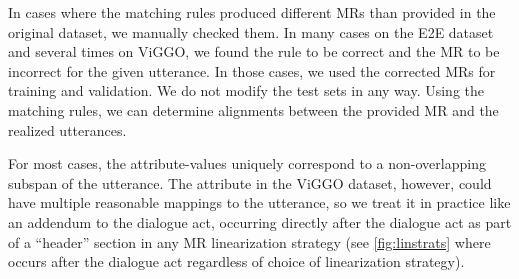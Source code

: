 In cases where the matching rules produced different MRs than provided in the
original dataset, we manually checked them. In many cases on the E2E dataset
and several times on ViGGO, we found the rule to be correct and the MR to be
incorrect for the given utterance. In those cases, we used the corrected MRs
for training and validation. %
We
do not modify the test sets in any way. Using the matching rules, we can
determine alignments between the provided MR and the realized utterances.

For most cases, the attribute-values uniquely correspond to a non-overlapping
subspan of the utterance. The  attribute in the ViGGO dataset,
however, could have multiple reasonable mappings to the utterance, so we treat
it in practice like an addendum to the dialogue act, occurring directly after the
dialogue act as part of a ``header'' section in any  MR linearization strategy
(see \autoref{fig:linstrats} where  occurs after the dialogue
act regardless of choice of linearization strategy).
